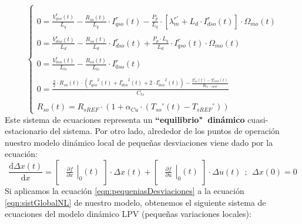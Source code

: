 \documentclass[10pt]{article}
\begin{document}
\begin{enumerate}
\begin{equation}
\begin{cases}
			\\
			\\
			0=\frac{V_{qso}^{r}(t)}{L_{q}}-\frac{R_{so}(t)}{L_{q}}\cdot I_{qso}^{r}(t)-\frac{P_{p}}{L_{q}}\cdot [ \lambda_{m}^{r'}+L_{d}\cdot I_{dso}^{r}(t) ]\cdot \Omega_{mo}(t)
			\\
			\\
			0=\frac{V_{dso}^{r}(t)}{L_{d}}-\frac{R_{so}\left ( t \right )}{L_{d}}\cdot I_{dso}^{r}(t)+\frac{P_{p}\cdot L_{q}}{L_{d}}\cdot I_{qso}^{r}(t)\cdot \Omega_{mo}(t)
			\\
			\\
			0=\frac{V_{0so}^{r}(t)}{L_{ls}}-\frac{R_{so}\left ( t \right )}{L_{ls}}\cdot I_{0so}^{r}(t)
			\\
			\\
			0=\frac{\frac{3}{2}\cdot R_{so}(t)\cdot \left ( {I_{qso}^{r}}^{2}(t)+{I_{dso}^{r}}^{2}(t)+2\cdot {I_{0so}^{r}}^{2}(t) \right )-\frac{T_{so}^{\circ}\left ( t \right )-T_{amb}^{\circ}\left ( t \right )}{R_{ts-amb}}}{C_{ts}}
			\\
			\\
			R_{so}(t)=R_{sREF}\cdot \left ( 1+\alpha_{Cu}\cdot \left ( {T_{so}}^{\circ}\left ( t \right )-{T_{sREF}}^{\circ} \right ) \right )
		\end{cases}
	\end{equation}
	Este sistema de ecuaciones representa un \textbf{``equilibrio"\  dinámico} cuasi-estacionario del sistema. Por otro lado, alrededor de los puntos de operación nuestro modelo dinámico local de pequeñas desviaciones viene dado por la ecuación:
	\begin{equation}
		\label{eqn:pequeniasDesviaciones}
		\frac{\mathrm{d} \Delta x(t)}{\mathrm{d} x}=
		\begin{bmatrix}
			\left.\begin{matrix}
				\frac{\partial f}{\partial x}
			\end{matrix}\right|_{0}(t)
		\end{bmatrix}\cdot\Delta x(t)+
		\begin{bmatrix}
			\left.\begin{matrix}
				\frac{\partial f}{\partial u}
			\end{matrix}\right|_{0}(t)
		\end{bmatrix}\cdot\Delta u(t)
		\ \ ;\ \ \Delta x(0)=0
	\end{equation}
	Si aplicamos la ecuación \ref{eqn:pequeniasDesviaciones} a la ecuación \ref{eqn:sistGlobalNL} de nuestro modelo, obtenemos el siguiente sistema de ecuaciones del modelo dinámico LPV (pequeñas variaciones locales):

\end{enumerate}
\end{document}
